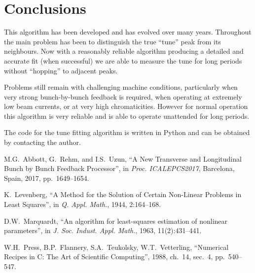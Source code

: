 \documentclass[
    a4paper,
    keeplastbox,            %
    hyphens,                %
    nospread,               %
    refpage,                %
]{jacow}
\begin{document}
\section{Conclusions}

This algorithm has been developed and has evolved over many years.  Throughout
the main problem has been to distinguish the true ``tune'' peak from its
neighbours.  Now with a reasonably reliable algorithm producing a detailed and
accurate fit (when successful) we are able to measure the tune for long periods
without ``hopping'' to adjacent peaks.

Problems still remain with challenging machine conditions, particularly when
very strong bunch-by-bunch feedback is required, when operating at extremely low
beam currents, or at very high chromaticities.  However for normal operation
this algorithm is very reliable and is able to operate unattended for long
periods.

The code for the tune fitting algorithm is written in Python and can be obtained
by contacting the author.


\begin{thebibliography}{99}


M.G.~Abbott, G.~Rehm, and I.S.~Uzun, \enquote{A New Transverse and Longitudinal
Bunch by Bunch Feedback Processor}, in \emph{Proc. ICALEPCS2017}, Barcelona,
Spain, 2017, pp.~1649--1654.

K.~Levenberg, \enquote{A Method for the Solution of Certain Non-Linear Problems
in Least Squares}, in \emph{Q. Appl. Math.}, 1944, 2:164--168.

D.W.~Marquardt, \enquote{An algorithm for least-squares estimation of nonlinear
parameters}, in \emph{J. Soc. Indust. Appl. Math.}, 1963, 11(2):431--441.

W.H.~Press, B.P.~Flannery, S.A.~Teukolsky, W.T.~Vetterling,
\enquote{Numerical Recipes in C: The Art of Scientific Computing},
1988, ch.~14, sec.~4, pp.~540--547.


\end{thebibliography}
\end{document}
